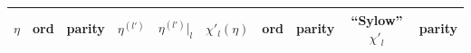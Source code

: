 \providecommand{\aqthreedata}{data/aq3/}
\footnotesize
\begin{tabular}{@{}lcc|ccccc|cc@{}}
\toprule
$\eta$ & ord & parity & $\eta^{(l')}$ & $\eta^{(l')}|_l$ & $\chi'_l(\eta)$
  & ord &
  parity & ``Sylow'' $\chi'_l$ & parity\\
\midrule

\end{tabular}
